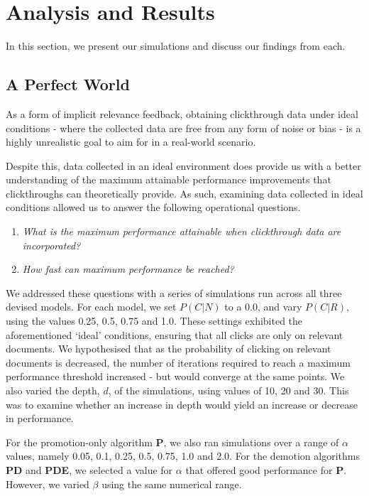 \section{Analysis and Results}\label{sec_results}
In this section, we present our simulations and discuss our findings from each.

\subsection{A Perfect World}
As a form of implicit relevance feedback, obtaining clickthrough data under ideal conditions - where the collected data are free from any form of noise or bias - is a highly unrealistic goal to aim for in a real-world scenario.

Despite this, data collected in an ideal environment does provide us with a better understanding of the maximum attainable performance improvements that clickthroughs can theoretically provide. As such, examining data collected in ideal conditions allowed us to answer the following operational questions.

\begin{enumerate}
	
	\item{\emph{What is the maximum performance attainable when clickthrough data are incorporated?}}
	
	\item{\emph{How fast can maximum performance be reached?}}
	
\end{enumerate}

We addressed these questions with a series of simulations run across all three devised models. For each model, we set $P(C|N)$ to a 0.0, and vary $P(C|R)$, using the values 0.25, 0.5, 0.75 and 1.0. These settings exhibited the aforementioned `ideal' conditions, ensuring that all clicks are only on relevant documents. We hypothesised that as the probability of clicking on relevant documents is decreased, the number of iterations required to reach a maximum performance threshold increased - but would converge at the same points. We also varied the depth, $d$, of the simulations, using values of 10, 20 and 30. This was to examine whether an increase in depth would yield an increase or decrease in performance.

For the promotion-only algorithm \textbf{P}, we also ran simulations over a range of $\alpha$ values, namely 0.05, 0.1, 0.25, 0.5, 0.75, 1.0 and 2.0. For the demotion algorithms \textbf{PD} and \textbf{PDE}, we selected a value for $\alpha$ that offered good performance for \textbf{P}. However, we varied $\beta$ using the same numerical range.

